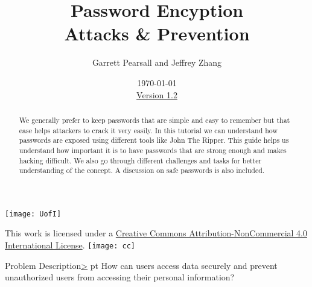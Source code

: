 \documentclass[12pt]{article}
\newenvironment{instructionblock}{\Large\bgroup}{\egroup}
\begin{document}
\title{ Password Encyption \\ \large Attacks \& Prevention}
\author{Garrett Pearsall and Jeffrey Zhang}
\date{\today \\ \hyperref[changelog]{Version 1.2} }
\renewcommand{\abstractname}{Summary}
\begin{titlepage}
\maketitle
{}
\begin{center}
\texttt{[image: UofI]}

\vskip 40pt

\end{center}

\begin{abstract}
We generally prefer to keep passwords that are simple and easy to remember but that ease helps attackers to crack it very easily. In this tutorial we can understand how passwords are exposed using different tools like John The Ripper. This guide helps us understand how important it is to have passwords that are strong enough and makes hacking difficult. We also go through different challenges and tasks for better understanding of the concept. A discussion on safe passwords is also included.  

\end{abstract}


\vfill
\begin{center}
This work is licensed under a \href{https://creativecommons.org/licenses/by-nc-nd/2.0/}{Creative Commons Attribution-NonCommercial 4.0 International License}.
\vskip 10pt
\texttt{[image: cc]}
\end{center}

\end{titlepage}


\pagebreak
\tableofcontents


\pagebreak
{}
\setcounter{section}{1}

\pagebreak
\begin{slide}{Problem Description}{\hyperref[slide 2]{\textgreater}}
 pt
\begin{instructionblock}
How can users access data securely and prevent unauthorized users from accessing their personal information? 
\end{instructionblock}
\end{slide}
\end{document}
